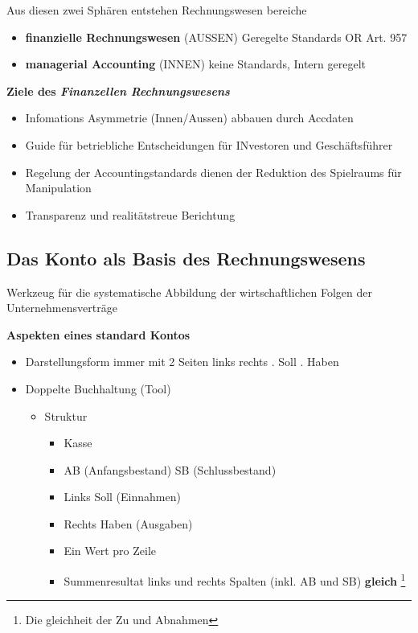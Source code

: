 Aus diesen zwei Sphären entstehen Rechnungswesen bereiche
\begin{itemize}
    \item \textbf{finanzielle Rechnungswesen} (AUSSEN)
        \subitem Geregelte Standards   
        \subitem OR Art. 957
    \item  \textbf{managerial Accounting} (INNEN)
        \subitem keine Standards, Intern geregelt 
\end{itemize}


\textbf{Ziele des \textit{Finanzellen Rechnungswesens}}
\begin{itemize}
    \item Infomations Asymmetrie (Innen/Aussen) abbauen durch Accdaten
    \item Guide für betriebliche Entscheidungen für INvestoren und Geschäftsführer
    \item Regelung der Accountingstandards dienen der Reduktion des Spielraums für Manipulation
    \item Transparenz und realitätstreue Berichtung
\end{itemize}

\subsection{Das Konto als Basis des Rechnungswesens}

\begin{definition}
    [Konto] Werkzeug für die systematische Abbildung der wirtschaftlichen Folgen der Unternehmensverträge
\end{definition}


\textbf{Aspekten eines standard Kontos}
\begin{itemize}
    \item Darstellungsform immer mit 2 Seiten links rechts
        . Soll
        . Haben
    \pagebreak
    \item Doppelte Buchhaltung (Tool)
    \begin{itemize}
        \item Struktur
        \begin{itemize}
            \item Kasse
            
            \item AB (Anfangsbestand) SB (Schlussbestand)
            
            \item Links Soll (Einnahmen)
            
            \item Rechts Haben (Ausgaben)
            
            \item Ein Wert pro Zeile
            
            \item Summenresultat links und rechts Spalten (inkl. AB und SB) \textbf{gleich} \footnote{Die gleichheit der Zu und Abnahmen}
            
        \end{itemize}
    \end{itemize}
\end{itemize}
            
